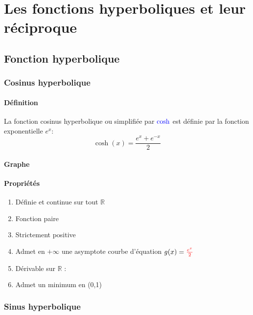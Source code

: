 \documentclass[12pt,a4paper]{report}
\begin{document}
	\chapter[Analyse]{Les fonctions hyperboliques et leur réciproque}
	\section*{Fonction hyperbolique}
	\subsection*{Cosinus hyperbolique}
	\subsubsection*{Définition}
	La fonction cosinus hyperbolique ou simplifiée par $\color{blue}\cosh$ est définie par la fonction exponentielle $e^x$: \[\cosh(x)=\dfrac{e^x+e^{-x}}{2} \]
	\subsubsection*{Graphe}
	\subsubsection*{Propriétés}
	\begin{enumerate}
		\item Définie et continue sur tout $\mathbb{R}$
		\item Fonction paire
		\item Strictement positive
		\item Admet en $+\infty$ une asymptote courbe d'équation $g(x)=\color{red}\frac{e^x}{2}$
		\item Dérivable sur $\mathbb{R}$ : 
		\item Admet un minimum en (0,1)
	\end{enumerate}
	
	\subsection*{Sinus hyperbolique}
\end{document}
